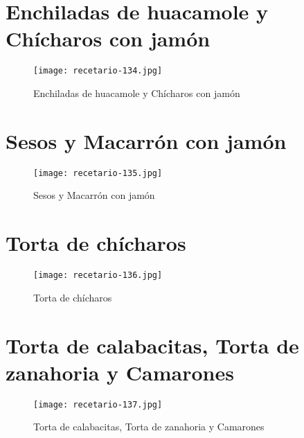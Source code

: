\documentclass[12pt,letterpaper]{article}
\begin{document}
\newpage

\section{Enchiladas de huacamole y Chícharos con jamón}
  \begin{figure}[H]
    \vspace{2pt}
  \texttt{[image: recetario-134.jpg]}
    \caption{Enchiladas de huacamole y Chícharos con jamón}
    
  \end{figure}

\newpage

\section{Sesos y Macarrón con jamón}
  \begin{figure}[H]
    \vspace{2pt}
  \texttt{[image: recetario-135.jpg]}
    \caption{Sesos y Macarrón con jamón}
    
  \end{figure}


\newpage

\section{Torta de chícharos}
  \begin{figure}[H]
    \vspace{2pt}
  \texttt{[image: recetario-136.jpg]}
    \caption{Torta de chícharos}
    
  \end{figure}


\newpage

\section{Torta de calabacitas, Torta de zanahoria y Camarones}
  \begin{figure}[H]
    \vspace{2pt}
  \texttt{[image: recetario-137.jpg]}
    \caption{Torta de calabacitas, Torta de zanahoria y Camarones}
    
  \end{figure}
\end{document}
